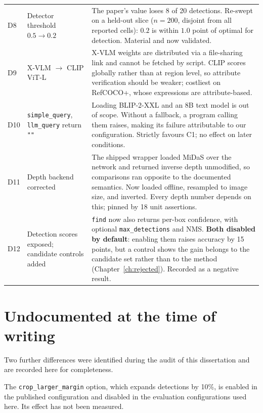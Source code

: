 \documentclass[12pt,a4paper,oneside]{report}
\begin{document}
\begin{longtable}{@{}p{}p{}p{}@{}}
D8 & Detector threshold $0.5 \to 0.2$ & The paper's value loses 8 of 20 detections.
Re-swept on a held-out slice ($n{=}200$, disjoint from all reported cells): $0.2$ is
within $1.0$ point of optimal for detection. Material and now validated. \\

D9 & X-VLM $\to$ CLIP ViT-L & X-VLM weights are distributed via a file-sharing link and
cannot be fetched by script. CLIP scores globally rather than at region level, so
attribute verification should be weaker; costliest on RefCOCO+, whose expressions are
attribute-based. \\

D10 & \texttt{simple\_query}, \texttt{llm\_query} return \texttt{""} & Loading BLIP-2-XXL
and an 8B text model is out of scope. Without a fallback, a program calling them raises,
making its failure attributable to our configuration. Strictly favours C1; no effect on
later conditions. \\

D11 & Depth backend corrected & The shipped wrapper loaded MiDaS over the network and
returned inverse depth unmodified, so comparisons ran opposite to the documented
semantics. Now loaded offline, resampled to image size, and inverted. Every depth number
depends on this; pinned by 18 unit assertions. \\

D12 & Detection scores exposed; candidate controls added & \texttt{find} now also returns
per-box confidence, with optional \texttt{max\_detections} and NMS. \textbf{Both disabled
by default}: enabling them raises accuracy by 15 points, but a control shows the gain
belongs to the candidate set rather than to the method
(Chapter~\ref{ch:rejected}). Recorded as a negative result. \\
\end{longtable}

\section{Undocumented at the time of writing}

Two further differences were identified during the audit of this dissertation and are
recorded here for completeness.

The \texttt{crop\_larger\_margin} option, which expands detections by 10\%, is enabled in
the published configuration and disabled in the evaluation configurations used here. Its
effect has not been measured.
\end{document}
